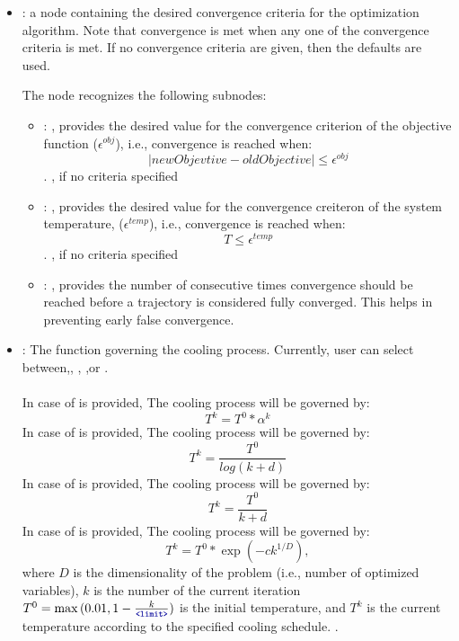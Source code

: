 \begin{itemize}
    \item {}:
      a node containing the desired convergence criteria for the optimization algorithm.
      Note that convergence is met when any one of the convergence criteria is met. If no
      convergence               criteria are given, then the defaults are used.

      The  node recognizes the following subnodes:
      \begin{itemize}
        \item {}: ,
          provides the desired value for the convergence criterion of the objective function
          ($\epsilon^{obj}$), i.e., convergence is reached when: $$ |newObjevtive - oldObjective|
          \le \epsilon^{obj}$$.                        , if no criteria specified

        \item {}: ,
          provides the desired value for the convergence creiteron of the system temperature,
          ($\epsilon^{temp}$), i.e., convergence is reached when: $$T \le \epsilon^{temp}$$.
          , if no criteria specified

        \item {}: ,
          provides the number of consecutive times convergence should be reached before a trajectory
          is considered fully converged. This helps in preventing early false convergence.
      \end{itemize}

    \item {}:
      The function governing the cooling process. Currently, user can select
      between,,                  ,
      ,or .\\ \\In case of  is
      provided, The cooling process will be governed by: $$ T^{k} = T^0 * \alpha^k$$
      In case of  is provided, The cooling process will be governed by: $$
      T^{k} = \frac{T^0}{log(k + d)}$$                  In case of  is provided,
      The cooling process will be governed by: $$ T^{k} = \frac{T^0}{k + d}$$In case of
       is provided, The cooling process will be governed by: $$ T^{k} =  T^0 *
      \exp(-ck^{1/D}),$$                  where $D$ is the dimensionality of the problem (i.e.,
      number of optimized variables), $k$ is the number of the current iteration
      $T^{0} = \max{(0.01,1-\frac{k}{\xmlNode{limit}})}$ is the initial temperature, and $T^{k}$ is
      the current temperature                  according to the specified cooling schedule.
      .


\end{itemize}
